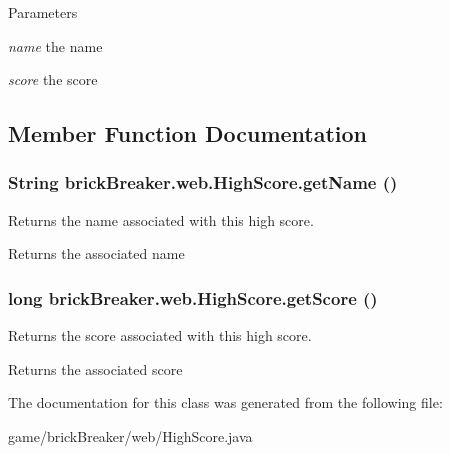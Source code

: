 \begin{DoxyParams}{Parameters}
\item[{\em name}]the name \item[{\em score}]the score \end{DoxyParams}


\subsection{Member Function Documentation}
\hypertarget{classbrick_breaker_1_1web_1_1_high_score_afc959404f76813aeb079bf435bb6a52d}{
\subsubsection[{getName}]{\setlength{\rightskip}{0pt plus 5cm}String brickBreaker.web.HighScore.getName ()}}
\label{classbrick_breaker_1_1web_1_1_high_score_afc959404f76813aeb079bf435bb6a52d}
Returns the name associated with this high score.

\begin{DoxyReturn}{Returns}
the associated name 
\end{DoxyReturn}
\hypertarget{classbrick_breaker_1_1web_1_1_high_score_a8f8c2b28d7975e261286f5dfb6d62752}{
\subsubsection[{getScore}]{\setlength{\rightskip}{0pt plus 5cm}long brickBreaker.web.HighScore.getScore ()}}
\label{classbrick_breaker_1_1web_1_1_high_score_a8f8c2b28d7975e261286f5dfb6d62752}
Returns the score associated with this high score.

\begin{DoxyReturn}{Returns}
the associated score 
\end{DoxyReturn}


The documentation for this class was generated from the following file:\begin{DoxyCompactItemize}
\item 
game/brickBreaker/web/HighScore.java\end{DoxyCompactItemize}
